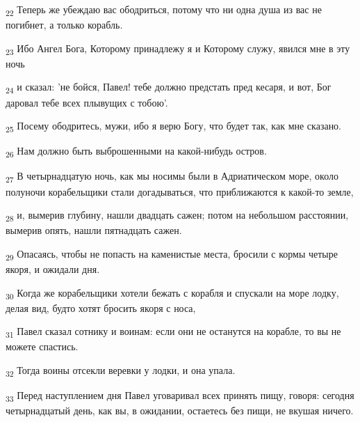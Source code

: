 \begin{tcolorbox}
\textsubscript{22} Теперь же убеждаю вас ободриться, потому что ни одна душа из вас не погибнет, а только корабль.
\end{tcolorbox}
\begin{tcolorbox}
\textsubscript{23} Ибо Ангел Бога, Которому принадлежу я и Которому служу, явился мне в эту ночь
\end{tcolorbox}
\begin{tcolorbox}
\textsubscript{24} и сказал: 'не бойся, Павел! тебе должно предстать пред кесаря, и вот, Бог даровал тебе всех плывущих с тобою'.
\end{tcolorbox}
\begin{tcolorbox}
\textsubscript{25} Посему ободритесь, мужи, ибо я верю Богу, что будет так, как мне сказано.
\end{tcolorbox}
\begin{tcolorbox}
\textsubscript{26} Нам должно быть выброшенными на какой-нибудь остров.
\end{tcolorbox}
\begin{tcolorbox}
\textsubscript{27} В четырнадцатую ночь, как мы носимы были в Адриатическом море, около полуночи корабельщики стали догадываться, что приближаются к какой-то земле,
\end{tcolorbox}
\begin{tcolorbox}
\textsubscript{28} и, вымерив глубину, нашли двадцать сажен; потом на небольшом расстоянии, вымерив опять, нашли пятнадцать сажен.
\end{tcolorbox}
\begin{tcolorbox}
\textsubscript{29} Опасаясь, чтобы не попасть на каменистые места, бросили с кормы четыре якоря, и ожидали дня.
\end{tcolorbox}
\begin{tcolorbox}
\textsubscript{30} Когда же корабельщики хотели бежать с корабля и спускали на море лодку, делая вид, будто хотят бросить якоря с носа,
\end{tcolorbox}
\begin{tcolorbox}
\textsubscript{31} Павел сказал сотнику и воинам: если они не останутся на корабле, то вы не можете спастись.
\end{tcolorbox}
\begin{tcolorbox}
\textsubscript{32} Тогда воины отсекли веревки у лодки, и она упала.
\end{tcolorbox}
\begin{tcolorbox}
\textsubscript{33} Перед наступлением дня Павел уговаривал всех принять пищу, говоря: сегодня четырнадцатый день, как вы, в ожидании, остаетесь без пищи, не вкушая ничего.
\end{tcolorbox}
